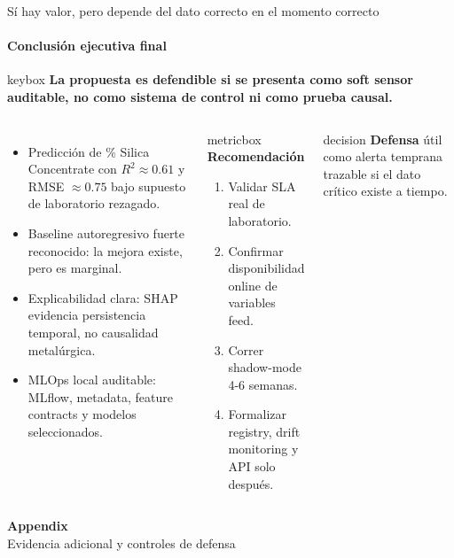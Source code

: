 \documentclass[aspectratio=169,10pt]{beamer}
\newcommand{\keymessage}[1]{%
  \vspace{-0.05cm}
  \begin{beamercolorbox}[wd=\textwidth,sep=0.62em,rounded=true]{keybox}
  \textbf{#1}
  \end{beamercolorbox}\vspace{0.10cm}
}
\newcommand{\decisionbox}[2]{%
  \begin{beamercolorbox}[wd=\textwidth,sep=0.65em,rounded=true]{decision}
  \textbf{\textcolor{MinsurBlue}{#1}}\hspace{0.25em} #2
  \end{beamercolorbox}
}
\begin{document}
\begin{frame}{Sí hay valor, pero depende del dato correcto en el momento correcto}
\framesubtitle{Conclusión ejecutiva final}
\keymessage{La propuesta es defendible si se presenta como soft sensor auditable, no como sistema de control ni como prueba causal.}
\begin{columns}[T]
\begin{itemize}
  \item Predicción de \% Silica Concentrate con $R^2 \approx 0.61$ y RMSE $\approx 0.75$ bajo supuesto de laboratorio rezagado.
  \item Baseline autoregresivo fuerte reconocido: la mejora existe, pero es marginal.
  \item Explicabilidad clara: SHAP evidencia persistencia temporal, no causalidad metalúrgica.
  \item MLOps local auditable: MLflow, metadata, feature contracts y modelos seleccionados.
\end{itemize}
\begin{beamercolorbox}[wd=\textwidth,sep=0.8em,rounded=true]{metricbox}
\textbf{Recomendación}\vspace{0.1cm}
\begin{enumerate}\scriptsize
  \item Validar SLA real de laboratorio.
  \item Confirmar disponibilidad online de variables feed.
  \item Correr shadow-mode 4-6 semanas.
  \item Formalizar registry, drift monitoring y API solo después.
\end{enumerate}
\end{beamercolorbox}
\vspace{0.12cm}
\decisionbox{Defensa}{útil como alerta temprana trazable si el dato crítico existe a tiempo.}
\end{columns}
\end{frame}

\appendix
\begin{frame}[plain]
\centering
\vspace{1.6cm}
{\Huge\bfseries\color{MinsurNavy}Appendix}\\[0.25cm]
{\Large\color{MinsurBlue}Evidencia adicional y controles de defensa}
\end{frame}
\end{document}
